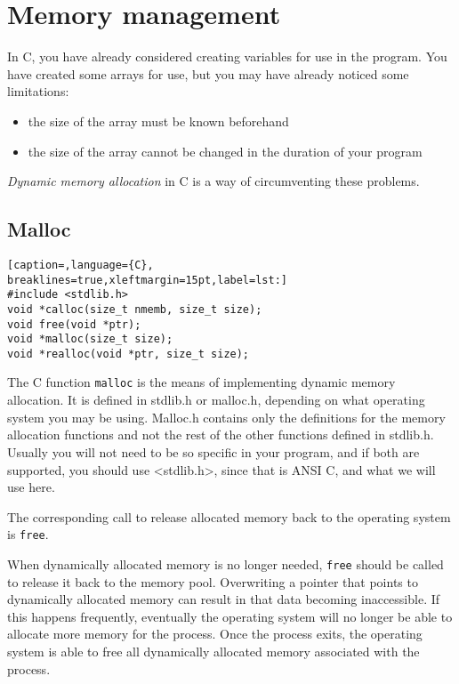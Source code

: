 \section{Memory management}
In C, you have already considered creating variables for use in the program.
You have created some arrays for use, but you may have already noticed some
limitations:
\begin{itemize}
	\item the size of the array must be known beforehand
	\item the size of the array cannot be changed in the duration of your
program
\end{itemize}

\emph{Dynamic memory allocation} in C is a way of circumventing these problems.

\subsection{Malloc}
\lstset{basicstyle=\scriptsize, numbers=left, captionpos=b, tabsize=4}
\begin{lstlisting}[caption=,language={C},
breaklines=true,xleftmargin=15pt,label=lst:]
#include <stdlib.h>
void *calloc(size_t nmemb, size_t size);
void free(void *ptr);
void *malloc(size_t size);
void *realloc(void *ptr, size_t size);
\end{lstlisting}

The C function \texttt{malloc} is the means of implementing dynamic memory
allocation. It is defined in stdlib.h or malloc.h, depending on what operating
system you may be using. Malloc.h contains only the definitions for the memory
allocation functions and not the rest of the other functions defined in
stdlib.h. Usually you will not need to be so specific in your program, and if
both are supported, you should use \textless{}stdlib.h\textgreater{}, since
that is ANSI C, and what we will use here.

The corresponding call to release allocated memory back to the operating system
is \texttt{free}.

When dynamically allocated memory is no longer needed, \texttt{free} should be
called to release it back to the memory pool. Overwriting a pointer that points
to dynamically allocated memory can result in that data becoming inaccessible.
If this happens frequently, eventually the operating system will no longer be
able to allocate more memory for the process. Once the process exits, the
operating system is able to free all dynamically allocated memory associated
with the process.

